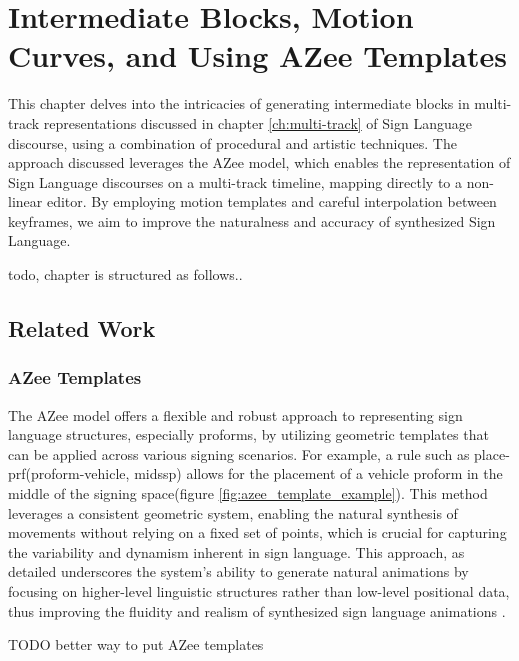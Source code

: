 \documentclass[../../main.tex]{subfiles}
\begin{document}
\chapter{Intermediate Blocks, Motion Curves, and Using AZee Templates}
\label{ch:intermediate_blocks}

This chapter delves into the intricacies of generating intermediate blocks in multi-track representations discussed in chapter \ref{ch:multi-track} of Sign Language discourse, using a combination of procedural and artistic techniques. The approach discussed leverages the AZee model, which enables the representation of Sign Language discourses on a multi-track timeline, mapping directly to a non-linear editor. By employing motion templates and careful interpolation between keyframes, we aim to improve the naturalness and accuracy of synthesized Sign Language.


todo, chapter is structured as follows.. 

\section{Related Work}
\label{ch:intermediate_blocks:related_work}



\subsection{AZee Templates}
\label{ch:intermediate_blocks:related_work:azee_templates}

The AZee model offers a flexible and robust approach to representing sign language structures, especially proforms, by utilizing geometric templates that can be applied across various signing scenarios. For example, a rule such as place-prf(proform-vehicle, midssp) allows for the placement of a vehicle proform in the middle of the signing space(figure \ref{fig:azee_template_example}). This method leverages a consistent geometric system, enabling the natural synthesis of movements without relying on a fixed set of points, which is crucial for capturing the variability and dynamism inherent in sign language. This approach, as detailed underscores the system's ability to generate natural animations by focusing on higher-level linguistic structures rather than low-level positional data, thus improving the fluidity and realism of synthesized sign language animations \cite{filhol2018extending}.

TODO better way to put AZee templates
\end{document}
